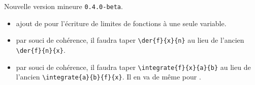 Nouvelle version mineure \verb+0.4.0-beta+.

\begin{itemize}[itemsep=.5em]
    \item {}
          ajout de  pour l'écriture de limites de fonctions à une seule variable.


    \separation

    \item {}
          par souci de cohérence, il faudra taper \verb#\der{f}{x}{n}# au lieu de l'ancien \verb#\der{f}{n}{x}#.


    \separation

    \item {}
          par souci de cohérence, il faudra taper \verb#\integrate{f}{x}{a}{b}# au lieu de l'ancien \verb#\integrate{a}{b}{f}{x}#.
          Il en va de même pour .


    \separation
\end{itemize}
